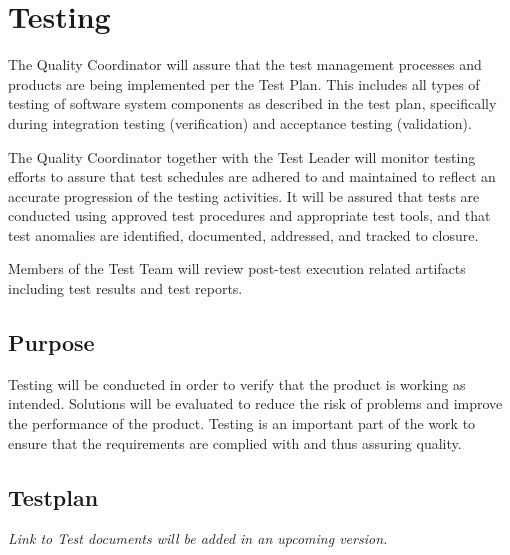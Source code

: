 \section{Testing}

The Quality Coordinator will assure that the test management processes and products are being implemented per the Test Plan. This includes all types of testing of software system components as described in the test plan, specifically during integration testing (verification) and acceptance testing (validation).

The Quality Coordinator together with the Test Leader will monitor testing efforts to assure that test schedules are adhered to and maintained to reflect an accurate progression of the testing activities. It will be assured that tests are conducted using approved test procedures and appropriate test tools, and that test anomalies are identified, documented, addressed, and tracked to closure.

Members of the Test Team will review post-test execution related artifacts including test results and test reports.

\subsection{Purpose}
Testing will be conducted in order to verify that the product is working as intended. Solutions will be evaluated to reduce the risk of problems and improve the performance of the product. Testing is an important part of the work to ensure that the requirements are complied with and thus assuring quality.

\subsection{Testplan}
\emph{Link to Test documents will be added in an upcoming version.}




